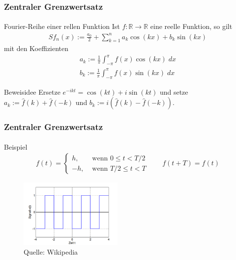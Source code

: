 \documentclass{beamer}
\begin{document}
\begin{frame}
    \frametitle{Zentraler Grenzwertsatz}
\framesubtitle{}

\begin{block}{Fourier-Reihe einer rellen Funktion}
Ist $f :\mathbb{R} \to \mathbb{R}$ eine reelle Funktion, so gilt
\begin{align*}
Sf_n(x) := \frac{a_0}{2} + \sum_{k= 1}^{n} a_k \cos (kx) + b_k \sin (kx)  
\end{align*}
mit den Koeffizienten
\begin{align*}
a_k := \frac{1}{ \pi} \int_{-\pi}^{\pi} f(x) \cos (kx)\; dx \\
b_k := \frac{1}{ \pi} \int_{-\pi}^{\pi} f(x) \sin (kx)\; dx
\end{align*}

\end{block}
\begin{block}{Beweisidee}
Ersetze   $e^{-ikt} = \cos(kt) + i \sin (kt)$ und setze $a_k := \hat{f}(k) + \hat{f}(-k)$ und $b_k :=  i(\hat{f}(k) - \hat{f}(-k))$.
\end{block}
 \end{frame}


\begin{frame}
    \frametitle{Zentraler Grenzwertsatz}
\framesubtitle{}

\begin{block}{Beispiel}
\begin{align*}
f(t) = \begin{cases} h, & \mbox{ wenn } 0\leq  t <T/2 \\ -h, & \mbox{ wenn } T/2 \leq t < T \end{cases}  \qquad f(t + T) = f(t)
\end{align*}
\end{block}
\begin{figure}[htp]
      \centering
    \includegraphics[width=0.45\textwidth]{img/rechteck}
      \caption{Quelle: Wikipedia}
\end{figure}

 \end{frame}
\end{document}

